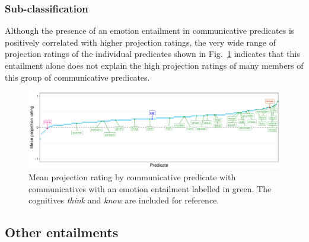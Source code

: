 \documentclass[11pt,fleqn]{article}
\newcommand{\figref}[1]{Fig.~\ref{#1}}
\newcommand{\6}{\mbox{$[\hspace*{-.6mm}[$}}
\newcommand{\9}{\mbox{$]\hspace*{-.6mm}]$}}
\begin{document}
\subsubsection{Sub-classification}

Although the presence of an emotion entailment in communicative predicates is positively correlated with higher projection ratings, the very wide range of projection ratings of the individual predicates shown in \figref{projemocomm} indicates that this entailment alone does not explain the high projection ratings of many members of this group of communicative predicates.

\begin{figure}[H]
	\centering
	\includegraphics[width=1\textwidth]{projection-by-communicative-emoComms}
	\caption{Mean projection rating by communicative predicate with communicatives with an emotion entailment labelled in green. The cognitives \emph{think} and \emph{know} are included for reference.}
	\label{projemocomm}
\end{figure}

\subsection{Other entailments}
\end{document}
